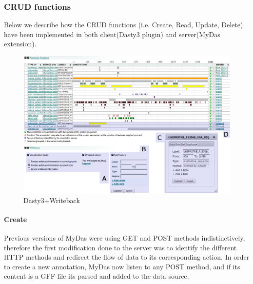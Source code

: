 

\subsubsection{CRUD functions}
Below we describe how the CRUD functions (i.e. Create, Read, Update, Delete) have been implemented in both client(Dasty3 plugin) and server(MyDas extension).

\begin{figure}[ht]
\centering
\includegraphics[width=6.5in]{figures/dasty3wbT.png} 
\caption{Dasty3+Writeback}  \label{fig: dasty+wb}
\end{figure}

\paragraph{Create}
Previous versions of MyDas were using GET and POST methods indistinctively, therefore the first modification done to the server was to identify the different HTTP methods and redirect the flow of data to its corresponding action. In order to create a new annotation, MyDas now listen to any POST method, and if its content is a GFF file its parsed and added to the data source. 

